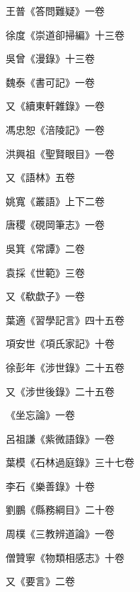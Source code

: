 \begin{pinyinscope}
 王普《答問難疑》一卷



 徐度《崇道卻掃編》十三卷



 吳曾《漫錄》十三卷



 魏泰《書可記》一卷



 又《續東軒雜錄》一卷



 馮忠恕《涪陵記》一卷



 洪興祖《聖賢眼目》一卷



 又《語林》五卷



 姚寬《叢語》上下二卷



 唐稷《硯岡筆志》一卷



 吳箕《常譚》二卷



 袁採《世範》三卷



 又《欷歔子》一卷



 葉適《習學記言》四十五卷



 項安世《項氏家記》十卷



 徐彭年《涉世錄》二十五卷



 又《涉世後錄》二十五卷



 《坐忘論》一卷



 呂祖謙《紫微語錄》一卷



 葉模《石林過庭錄》三十七卷



 李石《樂善錄》十卷



 劉鵬《縣務綱目》二十卷



 周樸《三教辨道論》一卷



 僧贊寧《物類相感志》十卷



 又《要言》二卷




\end{pinyinscope}
